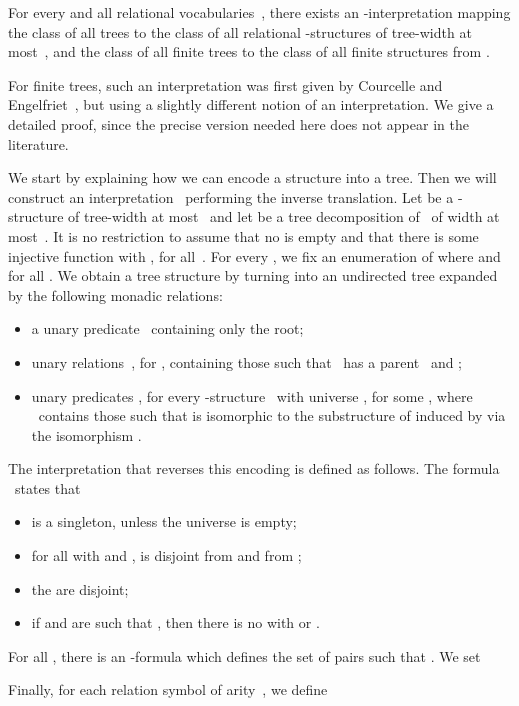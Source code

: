 \documentclass{LMCS}
\begin{document}
\begin{thm}
\begin{lem}\label{lem: interpretation for bounded twd}
For every  and all relational vocabularies~,
there exists an -interpretation
mapping the class of all trees to the class 
of all relational -structures of tree-width at most~,
and the class of all finite trees 
to the class of all finite structures from . 
\end{lem}
\proof
For finite trees, such an interpretation was first given
by Courcelle and Engelfriet~\cite{CourcelleEngelfriet95},
but using a slightly different notion of an interpretation.
We give a detailed proof, since the precise version needed here
does not appear in the literature.

We start by explaining how we can encode a structure 
into a tree.
Then we will construct an interpretation~ performing the inverse translation.
Let  be a -structure of tree-width at most~
and let  be a tree decomposition of~ of width at most~.
It is no restriction to assume that
no  is empty
and that there is some injective function 
with , for all~.
For every , we
fix an enumeration 
of  where 
and  for all .
We obtain a tree structure
by turning  into an undirected tree
expanded by the following monadic relations\?:
\begin{itemize}
\item a unary predicate~ containing only the root\?;
\item unary relations~, for ,
  containing those  such that ~has a parent~ and \?;
\item unary predicates , for every -structure~ with universe
  , for some ,
  where ~contains those  such that  is isomorphic
  to the substructure of  induced by 
  via the isomorphism .
\end{itemize}
The interpretation 
that reverses this encoding is defined as follows.
The formula ~states that
\begin{itemize}
\item  is a singleton, unless the universe is empty\?;
\item for all  with  and ,
   is disjoint from  and from \?;
\item the  are disjoint\?;
\item if  and  are such that ,
  then there is no  with  or .
\end{itemize}
For all ,
there is an -formula 
which defines the set of pairs  such that .
We set

Finally, for each relation symbol  of arity~, we define





\end{thm}
\end{document}
